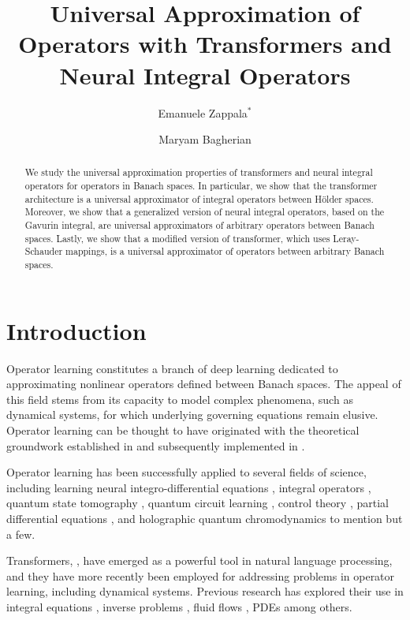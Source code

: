 \documentclass[a4paper,12pt,reqno]{amsart}
\title[Universal Approximation]{Universal Approximation of Operators with Transformers and Neural Integral Operators}
\author{Emanuele Zappala$^*$}\thanks{$^*$Corresponding author}
\author{Maryam Bagherian}
\theoremstyle{definition}
\theoremstyle{remark}
\begin{document}
\begin{abstract}
    We study the universal approximation properties of transformers and neural integral operators for operators in Banach spaces.
    In particular, we show that the transformer architecture is a universal approximator of integral operators between H\"older spaces. Moreover, we show that a generalized version of neural integral operators, based on the Gavurin integral, are universal approximators of arbitrary operators between Banach spaces. Lastly, we show that a modified version of transformer, which uses Leray-Schauder mappings, is a universal approximator of operators between arbitrary Banach spaces. 
\end{abstract}

\maketitle


\section{Introduction}

Operator learning constitutes a branch of deep learning dedicated to approximating nonlinear operators defined between Banach spaces. The appeal of this field stems from its capacity to model complex phenomena, such as dynamical systems, for which underlying governing equations remain elusive. Operator learning can be thought to have originated with the theoretical groundwork established in \cite{chen1995universal} and subsequently implemented in \cite{lu2021learning}.

Operator learning has been successfully applied to several fields of science, including learning neural integro-differential equations \cite{NIDE}, integral operators \cites{ANIE_NAT,ANIE}, quantum state tomography \cite{torlai2018neural}, quantum circuit learning \cite{mitarai2018quantum}, control theory \cite{Hwang_Lee_Shin_Hwang_2022}, partial differential equations \cite{PINN_NOperator}, and holographic quantum chromodynamics \cite{hashimoto2021neural} to mention but a few. 

Transformers, \cite{vaswani2017attention}, have emerged as a powerful tool in natural language processing, and they have more recently been employed for addressing problems in operator learning, including dynamical systems. Previous research has explored their use in integral equations \cite{ANIE_NAT,ANIE}, inverse problems \cite{guo2023transformer}, fluid flows \cite{geneva2022transformers}, PDEs \cite{cao2021choose} among others. 
\end{document}
